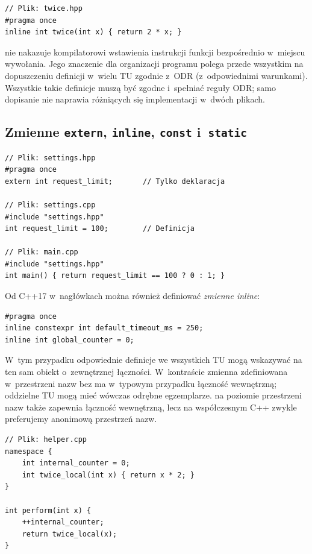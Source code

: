 \begin{lstlisting}[caption={Definicja inline przeznaczona do nagłówka.}]
// Plik: twice.hpp
#pragma once
inline int twice(int x) { return 2 * x; }
\end{lstlisting}

 nie nakazuje kompilatorowi wstawienia instrukcji funkcji
bezpośrednio w~miejscu wywołania. Jego znaczenie dla organizacji
programu polega przede wszystkim na dopuszczeniu definicji w~wielu TU
zgodnie z~ODR (z~odpowiednimi warunkami). Wszystkie takie definicje
muszą być zgodne i~spełniać reguły ODR; samo dopisanie 
nie naprawia różniących się implementacji w~dwóch plikach.

\subsection{Zmienne \texttt{extern}, \texttt{inline}, \texttt{const} i~\texttt{static}}

\begin{lstlisting}[caption={Jedna definicja zmiennej globalnej, wiele deklaracji.}]
// Plik: settings.hpp
#pragma once
extern int request_limit;       // Tylko deklaracja

// Plik: settings.cpp
#include "settings.hpp"
int request_limit = 100;        // Definicja

// Plik: main.cpp
#include "settings.hpp"
int main() { return request_limit == 100 ? 0 : 1; }
\end{lstlisting}

Od C++17 w~nagłówkach można również definiować \emph{zmienne inline}:
\begin{lstlisting}[caption={Zmienna inline w nagłówku (C++17).}]
#pragma once
inline constexpr int default_timeout_ms = 250;
inline int global_counter = 0;
\end{lstlisting}

W~tym przypadku odpowiednie definicje we wszystkich TU mogą
wskazywać na ten sam obiekt o~zewnętrznej łączności. W~kontraście
zmienna  zdefiniowana w~przestrzeni nazw bez 
ma w~typowym przypadku łączność wewnętrzną; oddzielne TU mogą mieć
wówczas odrębne egzemplarze.  na poziomie przestrzeni
nazw także zapewnia łączność wewnętrzną, lecz na współczesnym C++
zwykle preferujemy anonimową przestrzeń nazw.

\begin{lstlisting}[caption={Nazwy pomocnicze ograniczone do jednej TU.}]
// Plik: helper.cpp
namespace {
    int internal_counter = 0;
    int twice_local(int x) { return x * 2; }
}

int perform(int x) {
    ++internal_counter;
    return twice_local(x);
}
\end{lstlisting}


